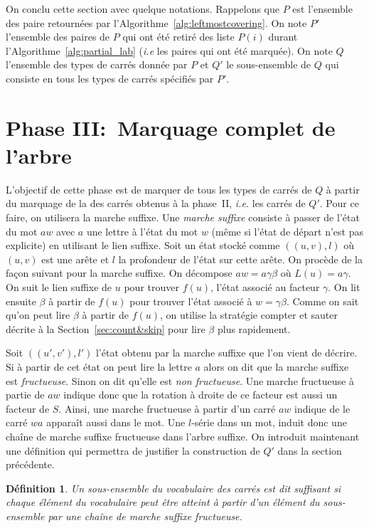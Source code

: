 \documentclass[10pt,letterpaper,oneside]{article}
\newtheorem{definition}{Définition}
\begin{document}
On conclu cette section avec quelque notations. Rappelons que $P$ est l'ensemble des paire retournées par l'Algorithme~\ref{alg:leftmostcovering}. On note $P'$ l'ensemble des paires de $P$ qui ont été retiré des liste $P(i)$ durant l'Algorithme~\ref{alg:partial_lab} (\emph{i.e} les paires qui ont été marquée). On note $Q$ l'ensemble des types de carrés donnée par $P$ et $Q'$ le sous-ensemble de $Q$ qui consiste en tous les types de carrés spécifiés par $P'$.

\section{Phase III:~Marquage complet de l'arbre}
L'objectif de cette phase est de marquer de tous les types de carrés de $Q$ à partir du marquage de la des carrés obtenus à la phase~II, \emph{i.e.} les carrés de $Q'$.
Pour ce faire, on utilisera la marche suffixe. 
Une \emph{marche suffixe} consiste à passer de l'état du mot $aw$ avec $a$ une lettre à l'état du mot $w$ (même si l'état de départ n'est pas explicite) en utilisant le lien suffixe.
Soit un état stocké comme $((u,v),l)$ où $(u,v)$ est une arête et $l$ la profondeur de l'état sur cette arête. On procède de la façon suivant pour la marche suffixe.
On décompose $aw=a\gamma\beta$ où $L(u)=a\gamma$.
On suit le lien suffixe de $u$ pour trouver $f(u)$, l'état associé au facteur $\gamma$. On lit ensuite $\beta$ à partir de $f(u)$ pour trouver l'état associé à $w=\gamma\beta$.
Comme on sait qu'on peut lire $\beta$ à partir de $f(u)$, on utilise la stratégie compter et sauter décrite à la Section~\ref{sec:count&skip} pour lire $\beta$ plus rapidement.

Soit $((u',v'),l')$ l'état obtenu par la marche suffixe que l'on vient de décrire.
Si à partir de cet état on peut lire la lettre $a$ alors on dit que la marche suffixe est \emph{fructueuse}.
Sinon on dit qu'elle est \emph{non fructueuse}.
Une marche fructueuse à partie de $aw$ indique donc que la rotation à droite  de ce facteur est aussi un facteur de $S$.
Ainsi, une marche fructueuse à partir d'un carré $aw$ indique de le carré $wa$ apparaît aussi dans le mot.
Une $l$-série dans un mot, induit donc une chaîne de marche suffixe fructueuse dans l'arbre suffixe.
On introduit maintenant une définition qui permettra de justifier la construction de $Q'$ dans la section précédente.

\begin{definition} \label{def:suffisant}
    Un sous-ensemble du vocabulaire des carrés est dit \emph{suffisant} si chaque élément du vocabulaire peut être atteint à partir d'un élément du sous-ensemble par une chaîne de marche suffixe fructueuse.
\end{definition}
\end{document}
